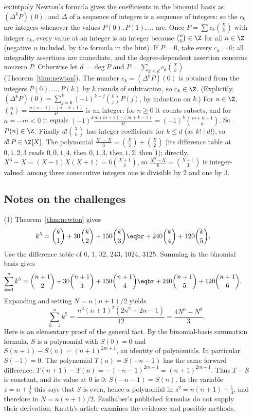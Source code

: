 \begin{solution}{ex:intpoly}
\idea Newton's formula gives the coefficients in the binomial basis as $(\Delta^kP)(0)$, and $\Delta$ of a sequence of integers is a sequence of integers: so the $c_k$ are integers whenever the values $P(0),P(1),\dots$ are. Once $P=\sum c_k\binom Xk$ with integer $c_k$, every value at an integer is an integer because $\binom nk\in\Z$ for all $n\in\Z$ (negative $n$ included, by the formula in the hint).
\writeup If $P=0$, take every $c_k=0$; all integrality assertions are immediate, and the degree-dependent assertion concerns nonzero $P$. Otherwise let $d=\deg P$ and $P=\sum_{k\le d}c_k\binom Xk$ (Theorem~\ref{thm:newton}). The number $c_k=(\Delta^kP)(0)$ is obtained from the integers $P(0),\dots,P(k)$ by $k$ rounds of subtraction, so $c_k\in\Z$. (Explicitly, $(\Delta^kP)(0)=\sum_{j=0}^k(-1)^{k-j}\binom kjP(j)$, by induction on $k$.) For $n\in\Z$, $\binom nk=\frac{n(n-1)\cdots(n-k+1)}{k!}$ is an integer: for $n\ge0$ it counts subsets, and for $n=-m<0$ it equals $(-1)^k\frac{m(m+1)\cdots(m+k-1)}{k!}=(-1)^k\binom{m+k-1}k$. So $P(n)\in\Z$. Finally $d!\binom Xk$ has integer coefficients for $k\le d$ (as $k!\mid d!$), so $d!\,P\in\Z[X]$. The polynomial $\frac{X^3-X}6=\binom X3+\binom X2$ (its difference table at $0,1,2,3$ reads $0,0,1,4$, then $0,1,3$, then $1,2$, then $1$); directly, $X^3-X=(X-1)X(X+1)=6\binom{X+1}3$, so $\frac{X^3-X}6=\binom{X+1}3$ is integer-valued: among three consecutive integers one is divisible by $2$ and one by $3$.
\end{solution}



\subsection*{Notes on the challenges}

(1) Theorem~\ref{thm:newton} gives
\[
\begin{aligned}
k^5&=\binom k1+30\binom k2+150\binom k3\eqbr+240\binom k4+120\binom k5.
\end{aligned}
\]
Use the difference table of $0$, $1$, $32$, $243$, $1024$, $3125$. Summing in the binomial basis gives
\[
\begin{aligned}
\sum_{k=1}^n k^5&=\binom{n+1}2+30\binom{n+1}3+150\binom{n+1}4\eqbr+240\binom{n+1}5+120\binom{n+1}6.
\end{aligned}
\]
Expanding and setting $N=n(n+1)/2$ yields
\[
\sum_{k=1}^n k^5=\frac{n^2(n+1)^2(2n^2+2n-1)}{12}=\frac{4N^3-N^2}3.
\]
Here is an elementary proof of the general fact. By the binomial-basis summation formula, $S$ is a polynomial with $S(0)=0$ and
$S(n+1)-S(n)=(n+1)^{2m+1}$, an identity of polynomials. In particular $S(-1)=0$.
The polynomial $T(n)=S(-n-1)$ has the same forward difference:
$T(n+1)-T(n)=-(-n-1)^{2m+1}=(n+1)^{2m+1}$.
Thus $T-S$ is constant, and its value at $0$ is $0$: $S(-n-1)=S(n)$.
In the variable $z=n+\frac12$ this says that $S$ is even, hence a polynomial in
$z^2=n(n+1)+\frac14$, and therefore in $N=n(n+1)/2$.
Faulhaber's published formulas do not supply their derivation; Knuth's article examines the evidence and possible methods.

